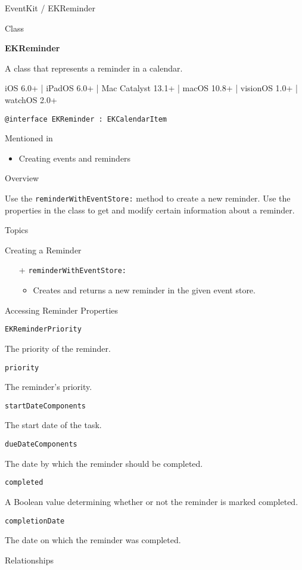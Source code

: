 \documentclass{article}
\title{}
\author{}
\date{}
\begin{document}
EventKit / EKReminder

Class

\textbf{EKReminder}

A class that represents a reminder in a calendar.

iOS 6.0+ | iPadOS 6.0+ | Mac Catalyst 13.1+ | macOS 10.8+ | visionOS 1.0+ | watchOS 2.0+

\texttt{@interface EKReminder : EKCalendarItem}

Mentioned in

\begin{itemize}
    \item Creating events and reminders
\end{itemize}

Overview

Use the \texttt{reminderWithEventStore:} method to create a new reminder. Use the properties in the class to get and modify certain information about a reminder.

Topics

Creating a Reminder

\begin{itemize}
\item[+] \texttt{reminderWithEventStore:}
\begin{itemize}
    \item Creates and returns a new reminder in the given event store.
\end{itemize}
\end{itemize}

Accessing Reminder Properties

\texttt{EKReminderPriority}

The priority of the reminder.

\texttt{priority}

The reminder's priority.

\texttt{startDateComponents}

The start date of the task.

\texttt{dueDateComponents}

The date by which the reminder should be completed.

\texttt{completed}

A Boolean value determining whether or not the reminder is marked completed.

\texttt{completionDate}

The date on which the reminder was completed.

Relationships
\end{document}
